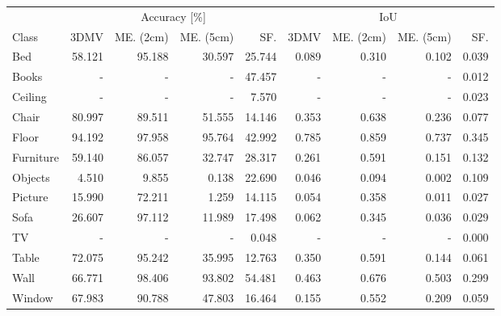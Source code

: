 \begin{tabular}{lrrrr|rrrr}
\toprule
 &   \multicolumn{4}{c}{Accuracy [\%]} & \multicolumn{4}{c}{IoU} \\
Class     &   3DMV &  ME. (2cm) &  ME. (5cm) &  SF. &   3DMV &  ME. (2cm) &  ME. (5cm) &  SF.\\
\midrule
Bed       & 58.121 &             95.188 &             30.597 &          25.744 & 0.089 &              0.310 &              0.102 &           0.039 \\
Books     &    - &                - &                - &          47.457 &   - &                - &                - &           0.012 \\
Ceiling   &    - &                - &                - &           7.570 &   - &                - &                - &           0.023 \\
Chair     & 80.997 &             89.511 &             51.555 &          14.146 & 0.353 &              0.638 &              0.236 &           0.077 \\
Floor     & 94.192 &             97.958 &             95.764 &          42.992 & 0.785 &              0.859 &              0.737 &           0.345 \\
Furniture & 59.140 &             86.057 &             32.747 &          28.317 & 0.261 &              0.591 &              0.151 &           0.132 \\
Objects   &  4.510 &              9.855 &              0.138 &          22.690 & 0.046 &              0.094 &              0.002 &           0.109 \\
Picture   & 15.990 &             72.211 &              1.259 &          14.115 & 0.054 &              0.358 &              0.011 &           0.027 \\
Sofa      & 26.607 &             97.112 &             11.989 &          17.498 & 0.062 &              0.345 &              0.036 &           0.029 \\
TV        &    - &                - &                - &           0.048  &   - &                - &                - &           0.000 \\
Table     & 72.075 &             95.242 &             35.995 &          12.763 & 0.350 &              0.591 &              0.144 &           0.061 \\
Wall      & 66.771 &             98.406 &             93.802 &          54.481 & 0.463 &              0.676 &              0.503 &           0.299 \\
Window    & 67.983 &             90.788 &             47.803 &          16.464 & 0.155 &              0.552 &              0.209 &           0.059 \\
\bottomrule
\end{tabular}
